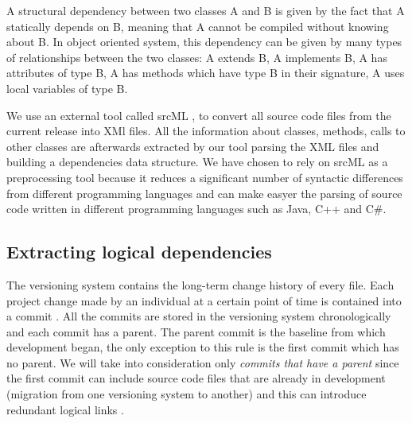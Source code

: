 \documentclass[conference]{IEEEtran}
\begin{document}
A structural dependency between two classes A and B is given by the fact that A statically depends on B, meaning that A cannot be compiled without knowing about B. In object oriented system, this dependency can be given by many types of relationships between the two classes: A extends B, A implements B, A has attributes of type B, A has methods which have type B in their signature, A uses local variables of type B.


 We use an external tool called srcML \cite{2003:XLC:851042.857028},
\cite{Collard:2011:LTF:2067850.2068011} to convert all source code files from the current release into XMl files. All the information about classes, methods, calls to other classes are afterwards extracted by our tool parsing the XML files and building a dependencies data structure. We have chosen to rely on srcML as a preprocessing tool because it reduces a significant number of syntactic differences from different programming languages and can make easyer the parsing of source code written in different programming languages such as Java, C++ and C\#.    

\subsection{Extracting logical dependencies}

The versioning system contains the long-term change history of every file. Each project change made by an individual at a certain point of time is contained into a commit \cite{svn}. All the commits are stored in the versioning system chronologically and each commit has a parent. The parent commit is the baseline from which development began, the only exception to this rule is the first commit which has no parent. We will take into consideration only \textit{commits that have a parent} since the first commit can include source code files that are already in development (migration from one versioning system to another) and this can introduce redundant logical links \cite{DBLP:journals/jss/AjienkaC17}. 
\end{document}
